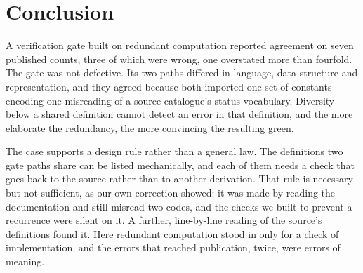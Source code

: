 \section{Conclusion}

A verification gate built on redundant computation reported agreement on seven
published counts, three of which were wrong, one overstated more than fourfold.
The gate was not defective. Its two paths differed in language, data structure
and representation, and they agreed because both imported one set of constants
encoding one misreading of a source catalogue's status vocabulary. Diversity
below a shared definition cannot detect an error in that definition, and the
more elaborate the redundancy, the more convincing the resulting green.

The case supports a design rule rather than a general law. The definitions two
gate paths share can be listed mechanically, and each of them needs a check that
goes back to the source rather than to another derivation. That rule is necessary
but not sufficient, as our own correction showed: it was made by reading the
documentation and still misread two codes, and the checks we built to prevent a
recurrence were silent on it. A further, line-by-line reading of the source's
definitions found it. Here redundant computation stood in only for a check of implementation, and
the errors that reached publication, twice, were errors of meaning.
